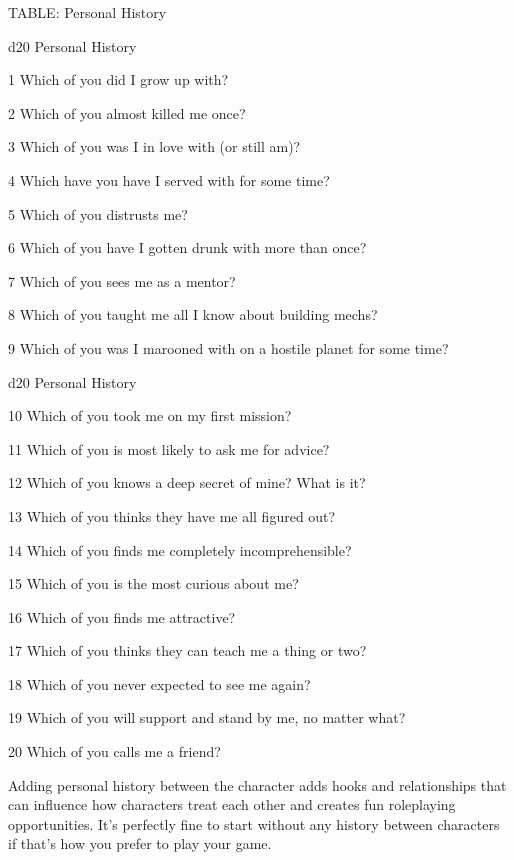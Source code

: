 TABLE: Personal History  

 d20       Personal	History 

 1         Which of you did I grow up with? 

 2         Which of you almost killed me once? 

 3         Which of you was I in love with (or still am)? 

 4         Which have you have I served with for some time? 

 5         Which of you distrusts me? 

 6         Which of you have I gotten drunk with more than once? 

 7         Which of you sees me as a mentor? 

 8         Which of you taught me all I know about building mechs? 

 9         Which of you was I marooned with on a hostile planet for some time? 

                                                                                                                


 d20       Personal	History 

  10       Which of you took me on my first mission? 

  11       Which of you is most likely to ask me for advice? 

  12       Which of you knows a deep secret of mine? What is it? 

  13       Which of you thinks they have me all figured out? 

  14       Which of you finds me completely incomprehensible? 

  15       Which of you is the most curious about me? 

  16       Which of you finds me attractive? 

  17       Which of you thinks they can teach me a thing or two? 

  18       Which of you never expected to see me again? 

  19       Which of you will support and stand by me, no matter what? 

  20       Which of you calls me a friend? 

Adding personal history between the character adds hooks and relationships that can influence  
how characters treat each other and creates fun roleplaying opportunities. It’s perfectly fine to  
start without any history between characters if that’s how you prefer to play your game.
 
